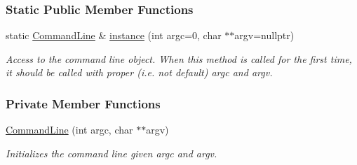 \subsubsection*{Static Public Member Functions}
\begin{DoxyCompactItemize}
\item 
static \hyperlink{structslb_1_1core_1_1commandLine_1_1CommandLine}{Command\+Line} \& \hyperlink{structslb_1_1core_1_1commandLine_1_1CommandLine_a297df54d1f330d491717b487968b0fc5}{instance} (int argc=0, char $\ast$$\ast$argv=nullptr)
\begin{DoxyCompactList}\small\item\em Access to the command line object. When this method is called for the first time, it should be called with proper (i.\+e. not default) {\ttfamily argc} and {\ttfamily argv}. \end{DoxyCompactList}\end{DoxyCompactItemize}
\subsubsection*{Private Member Functions}
\begin{DoxyCompactItemize}
\item 
\hyperlink{structslb_1_1core_1_1commandLine_1_1CommandLine_a483a8ee633d26d4e6423387d5f81daf7}{Command\+Line} (int argc, char $\ast$$\ast$argv)
\begin{DoxyCompactList}\small\item\em Initializes the command line given {\ttfamily argc} and {\ttfamily argv}. \end{DoxyCompactList}\end{DoxyCompactItemize}
